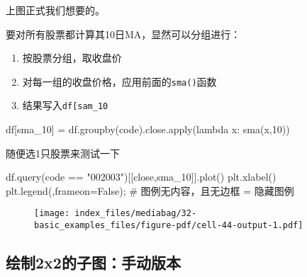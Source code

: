 \documentclass[
  letterpaper,
  DIV=11,
  numbers=noendperiod]{scrreprt}
\newenvironment{Shaded}{\begin{snugshade}}{\end{snugshade}}
\newcommand{\BuiltInTok}[1]{\textcolor[rgb]{0.00,0.23,0.31}{#1}}
\newcommand{\CommentTok}[1]{\textcolor[rgb]{0.37,0.37,0.37}{#1}}
\newcommand{\DecValTok}[1]{\textcolor[rgb]{0.68,0.00,0.00}{#1}}
\newcommand{\KeywordTok}[1]{\textcolor[rgb]{0.00,0.23,0.31}{#1}}
\newcommand{\NormalTok}[1]{\textcolor[rgb]{0.00,0.23,0.31}{#1}}
\newcommand{\OperatorTok}[1]{\textcolor[rgb]{0.37,0.37,0.37}{#1}}
\newcommand{\StringTok}[1]{\textcolor[rgb]{0.13,0.47,0.30}{#1}}
\newcommand{\VariableTok}[1]{\textcolor[rgb]{0.07,0.07,0.07}{#1}}
\providecommand{\tightlist}{%
  \setlength{\itemsep}{0pt}\setlength{\parskip}{0pt}}\usepackage{longtable,booktabs,array}
\begin{document}
上图正式我们想要的。

要对所有股票都计算其10日MA，显然可以分组进行：

\begin{enumerate}
\def\labelenumi{\arabic{enumi}.}
\tightlist
\item
  按股票分组，取收盘价
\item
  对每一组的收盘价格，应用前面的\texttt{sma()}函数
\item
  结果写入\texttt{df{[}\textquotesingle{}sam\_10\textquotesingle{}{]}}
\end{enumerate}

\begin{Shaded}
\begin{Highlighting}[]
\NormalTok{df[}\StringTok{\textquotesingle{}sma\_10\textquotesingle{}}\NormalTok{] }\OperatorTok{=}\NormalTok{ df.groupby(}\StringTok{\textquotesingle{}code\textquotesingle{}}\NormalTok{).close.}\BuiltInTok{apply}\NormalTok{(}\KeywordTok{lambda}\NormalTok{ x: sma(x,}\DecValTok{10}\NormalTok{))}
\end{Highlighting}
\end{Shaded}

随便选1只股票来测试一下

\begin{Shaded}
\begin{Highlighting}[]
\NormalTok{df.query(}\StringTok{\textquotesingle{}code == "002003"\textquotesingle{}}\NormalTok{)[[}\StringTok{\textquotesingle{}close\textquotesingle{}}\NormalTok{,}\StringTok{\textquotesingle{}sma\_10\textquotesingle{}}\NormalTok{]].plot()}
\NormalTok{plt.xlabel(}\StringTok{\textquotesingle{}\textquotesingle{}}\NormalTok{)}
\NormalTok{plt.legend(}\StringTok{\textquotesingle{}\textquotesingle{}}\NormalTok{,frameon}\OperatorTok{=}\VariableTok{False}\NormalTok{)}\OperatorTok{;} \CommentTok{\# 图例无内容，且无边框 = 隐藏图例}
\end{Highlighting}
\end{Shaded}

\begin{figure}[H]

{\centering \texttt{[image: index\_files/mediabag/32-basic\_examples\_files/figure-pdf/cell-44-output-1.pdf]}

}

\end{figure}

\hypertarget{ux7ed8ux52362x2ux7684ux5b50ux56feux624bux52a8ux7248ux672c}{%
\subsection{绘制2x2的子图：手动版本}\label{ux7ed8ux52362x2ux7684ux5b50ux56feux624bux52a8ux7248ux672c}}
\end{document}
